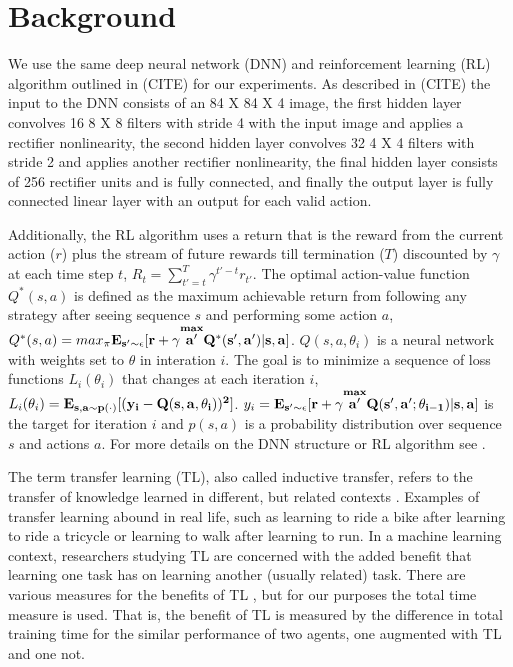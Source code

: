 \documentclass{article}
\begin{document}
\section{Background}

We use the same deep neural network (DNN) and reinforcement learning (RL) algorithm outlined in (CITE) for our experiments. 
As described in (CITE) the input to the DNN consists of an 84 X 84 X 4 image, the first hidden layer convolves 16 8 X 8 filters with stride 4 with the input image and applies a rectifier nonlinearity, the second hidden layer convolves 32 4 X 4 filters with stride 2 and applies another rectifier nonlinearity, the final hidden layer consists of 256 rectifier units and is fully connected, and finally the output layer is fully connected linear layer with an output for each valid action. 

Additionally, the RL algorithm uses a return that is the reward from the current action ($r$) plus the stream of future rewards till termination ($T$) discounted by $\gamma$ at each time step $t$, $R_{t}=\sum_{t' = t}^{T}\gamma^{t'-t}r_{t'}$.
The optimal action-value function $Q^{*}(s,a)$ is defined as the maximum achievable return from following any strategy after seeing sequence $s$ and performing some action $a$, $Q^{*}(s,a)=max_{\pi}\bf{E}_{s' \sim \epsilon} [r + \gamma \overset{max}{a'} Q^{*}(s',a') | s,a]$.
$Q(s,a,\theta_{i})$ is a neural network with weights set to $\theta$ in interation $i$.
The goal is to minimize a sequence of loss functions $L_{i}(\theta_{i})$ that changes at each iteration $i$, $L_{i}(\theta_{i}) = \bf{E}_{s,a \sim p(\cdot)}[(y_{i}-Q(s,a,\theta_{i}))^{2}]$.
$y_{i}=\bf{E}_{s' \sim \epsilon} [r + \gamma \overset{max}{a'} Q(s',a';\theta_{i-1})|s,a]$ is the target for iteration $i$ and $p(s,a)$ is a probability distribution over sequence $s$ and actions $a$. 
For more details on the DNN structure or RL algorithm see \citep{mnih2015human}.

The term transfer learning (TL), also called inductive transfer, refers to the transfer of knowledge learned in different, but related contexts \citep{ramon2007transfer}.
Examples of transfer learning abound in real life, such as learning to ride a bike after learning to ride a tricycle or learning to walk after learning to run. 
In a machine learning context, researchers studying TL are concerned with the added benefit that learning one task has on learning another (usually related) task.
There are various measures for the benefits of TL \citep{taylor2009transfer}, but for our purposes the total time measure is used.
That is, the benefit of TL is measured by the difference in total training time for the similar performance of two agents, one augmented with TL and one not. 
\end{document}

